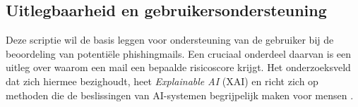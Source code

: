 \subsection{Uitlegbaarheid en gebruikersondersteuning}
\label{subsec:uitlegbaarheid-en-gebruikersondersteuning}

Deze scriptie wil de basis leggen voor ondersteuning van de gebruiker bij de beoordeling van potentiële phishingmails. Een cruciaal onderdeel daarvan is een uitleg over waarom een mail een bepaalde risicoscore krijgt. Het onderzoeksveld dat zich hiermee bezighoudt, heet \emph{Explainable AI} (XAI) en richt zich op methoden die de beslissingen van AI-systemen begrijpelijk maken voor mensen \autocite{Guidotti2018}.


